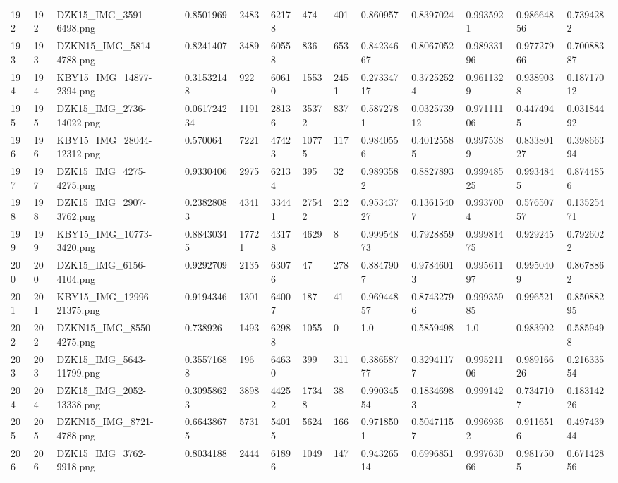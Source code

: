 \documentclass[11pt, a4paper, twoside]{report}
\begin{document}
\begin{longtable}[c]{@{}lllllllllllll@{}}
192 & 192 & DZK15\_IMG\_3591-6498.png & 0.8501969 & 2483 & 62178 & 474 & 401 & 0.860957 & 0.8397024 & 0.9935921 & 0.98664856 & 0.7394282 \\
193 & 193 & DZKN15\_IMG\_5814-4788.png & 0.8241407 & 3489 & 60558 & 836 & 653 & 0.84234667 & 0.8067052 & 0.98933196 & 0.97727966 & 0.70088387 \\
194 & 194 & KBY15\_IMG\_14877-2394.png & 0.31532148 & 922 & 60610 & 1553 & 2451 & 0.27334717 & 0.37252524 & 0.9611329 & 0.9389038 & 0.18717012 \\
195 & 195 & DZK15\_IMG\_2736-14022.png & 0.061724234 & 1191 & 28136 & 35372 & 837 & 0.5872781 & 0.032573912 & 0.97111106 & 0.4474945 & 0.03184492 \\
196 & 196 & KBY15\_IMG\_28044-12312.png & 0.570064 & 7221 & 47423 & 10775 & 117 & 0.9840556 & 0.40125585 & 0.9975389 & 0.83380127 & 0.39866394 \\
197 & 197 & DZK15\_IMG\_4275-4275.png & 0.9330406 & 2975 & 62134 & 395 & 32 & 0.9893582 & 0.8827893 & 0.99948525 & 0.9934845 & 0.8744856 \\
198 & 198 & DZK15\_IMG\_2907-3762.png & 0.23828083 & 4341 & 33441 & 27542 & 212 & 0.95343727 & 0.13615407 & 0.9937004 & 0.57650757 & 0.13525471 \\
199 & 199 & KBY15\_IMG\_10773-3420.png & 0.88430345 & 17721 & 43178 & 4629 & 8 & 0.99954873 & 0.7928859 & 0.99981475 & 0.929245 & 0.7926022 \\
200 & 200 & DZK15\_IMG\_6156-4104.png & 0.9292709 & 2135 & 63076 & 47 & 278 & 0.8847907 & 0.97846013 & 0.99561197 & 0.9950409 & 0.8678862 \\
201 & 201 & KBY15\_IMG\_12996-21375.png & 0.9194346 & 1301 & 64007 & 187 & 41 & 0.96944857 & 0.87432796 & 0.99935985 & 0.996521 & 0.85088295 \\
202 & 202 & DZKN15\_IMG\_8550-4275.png & 0.738926 & 1493 & 62988 & 1055 & 0 & 1.0 & 0.5859498 & 1.0 & 0.983902 & 0.5859498 \\
203 & 203 & DZK15\_IMG\_5643-11799.png & 0.35571688 & 196 & 64630 & 399 & 311 & 0.38658777 & 0.32941177 & 0.99521106 & 0.98916626 & 0.21633554 \\
204 & 204 & DZK15\_IMG\_2052-13338.png & 0.30958623 & 3898 & 44252 & 17348 & 38 & 0.99034554 & 0.18346983 & 0.999142 & 0.7347107 & 0.18314226 \\
205 & 205 & DZKN15\_IMG\_8721-4788.png & 0.66438675 & 5731 & 54015 & 5624 & 166 & 0.9718501 & 0.50471157 & 0.9969362 & 0.9116516 & 0.49743944 \\
206 & 206 & DZK15\_IMG\_3762-9918.png & 0.8034188 & 2444 & 61896 & 1049 & 147 & 0.94326514 & 0.6996851 & 0.99763066 & 0.9817505 & 0.67142856 \\

\end{longtable}
\end{document}
